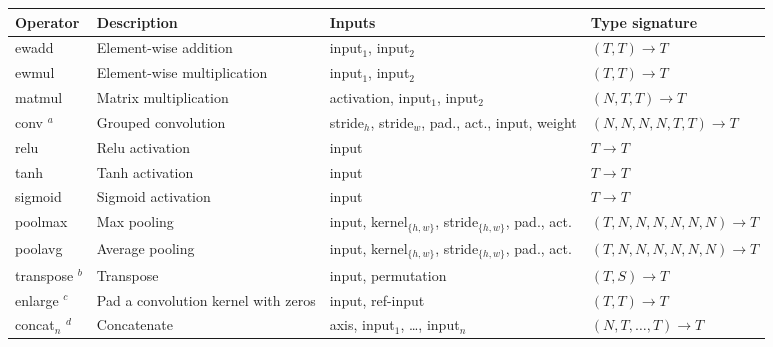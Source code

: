 \begin{table}[t]
    \centering
    \label{table:ops}
    \begin{adjustbox}{width=\linewidth}
    \begin{tabular}{llll}
    \hline
        {\bf Operator}  & {\bf Description}                   & {\bf Inputs}                                                & {\bf Type signature} \\
    \hline
        ewadd           & Element-wise addition               & input$_1$, input$_2$                                        & $(T, T) \rightarrow T$ \\
        ewmul           & Element-wise multiplication         & input$_1$, input$_2$                                        & $(T, T) \rightarrow T$ \\
        matmul          & Matrix multiplication               & activation, input$_1$, input$_2$                            & $(N, T, T) \rightarrow T$ \\
        conv $^a$       & Grouped convolution                 & stride$_h$, stride$_w$, pad., act., input, weight           & $(N, N, N, N, T, T) \rightarrow T$ \\
        relu            & Relu activation                     & input                                                       & $T \rightarrow T$ \\
        tanh            & Tanh activation                     & input                                                       & $T \rightarrow T$ \\
        sigmoid         & Sigmoid activation                  & input                                                       & $T \rightarrow T$ \\
        poolmax         & Max pooling                         & {input, kernel$_{\{h,w\}}$, stride$_{\{h,w\}}$, pad., act.} & $(T, N, N, N, N, N, N) \rightarrow T$ \\
        poolavg         & Average pooling                     & {input, kernel$_{\{h,w\}}$, stride$_{\{h,w\}}$, pad., act.} & $(T, N, N, N, N, N, N) \rightarrow T$ \\
        transpose $^b$  & Transpose                           & input, permutation                                          & $(T, S) \rightarrow T$ \\
        enlarge $^c$    & Pad a convolution kernel with zeros & input, ref-input                                            & $(T, T) \rightarrow T$ \\
        concat$_n$ $^d$ & Concatenate                         & axis, input$_1$, \dots, input$_n$                           & $(N, T, \dots, T) \rightarrow T$ \\

\end{tabular}
\end{adjustbox}
\end{table}
